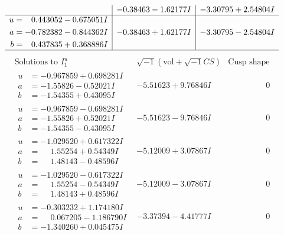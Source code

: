 \documentclass[1p]{elsarticle_modified}
\theoremstyle{definition}
\newcommand{\I}{\sqrt{-1}}
\begin{document}
$$\begin{array}{c|c|c}
 & -0.38463 - 1.62177 I & -3.30795 + 2.54804 I \\ \hline\begin{aligned}
u &= \phantom{-}0.443052 - 0.675051 I \\
a &= -0.782382 - 0.844362 I \\
b &= \phantom{-}0.437835 + 0.368886 I\end{aligned}
 & -0.38463 + 1.62177 I & -3.30795 - 2.54804 I\\
 \hline 
 \end{array}$$\newpage$$\begin{array}{c|c|c}  
\text{Solutions to }I^u_{1}& \I (\text{vol} + \sqrt{-1}CS) & \text{Cusp shape}\\
 \hline 
\begin{aligned}
u &= -0.967859 + 0.698281 I \\
a &= -1.55826 - 0.52021 I \\
b &= -1.54355 + 0.43095 I\end{aligned}
 & -5.51623 + 9.76846 I & \phantom{-0.000000 } 0 \\ \hline\begin{aligned}
u &= -0.967859 - 0.698281 I \\
a &= -1.55826 + 0.52021 I \\
b &= -1.54355 - 0.43095 I\end{aligned}
 & -5.51623 - 9.76846 I & \phantom{-0.000000 } 0 \\ \hline\begin{aligned}
u &= -1.029520 + 0.617322 I \\
a &= \phantom{-}1.55254 + 0.54349 I \\
b &= \phantom{-}1.48143 - 0.48596 I\end{aligned}
 & -5.12009 + 3.07867 I & \phantom{-0.000000 } 0 \\ \hline\begin{aligned}
u &= -1.029520 - 0.617322 I \\
a &= \phantom{-}1.55254 - 0.54349 I \\
b &= \phantom{-}1.48143 + 0.48596 I\end{aligned}
 & -5.12009 - 3.07867 I & \phantom{-0.000000 } 0 \\ \hline\begin{aligned}
u &= -0.303232 + 1.174180 I \\
a &= \phantom{-}0.067205 - 1.186790 I \\
b &= -1.340260 + 0.045475 I\end{aligned}
 & -3.37394 - 4.41777 I & \phantom{-0.000000 } 0 \\ \hline\begin{aligned}

\end{aligned}
\end{array}$$
\end{document}
